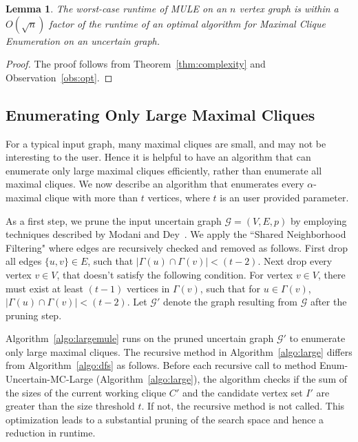 \documentclass[11pt,letterpaper]{article}
\newtheorem{lemma}{Lemma}
\newcommand{\ugraph}{\mathcal{G}}
\begin{document}
\begin{lemma}
\label{obs:timefactor}
The worst-case runtime of MULE on an $n$ vertex graph is within a $O(\sqrt{n})$ factor of the runtime of an optimal algorithm for Maximal Clique Enumeration on an uncertain graph.
\end{lemma}

\begin{proof}
The proof follows from Theorem~\ref{thm:complexity} and Observation~\ref{obs:opt}. 
\end{proof}

\subsection{Enumerating Only Large Maximal Cliques}
For a typical input graph, many maximal cliques are small, and may not be interesting to the user. Hence it is helpful to have an algorithm that can enumerate only large maximal cliques efficiently, rather than enumerate all maximal cliques. We now describe an algorithm that enumerates every $\alpha$-maximal clique with more than $t$ vertices, where $t$ is an user provided parameter.

As a first step, we prune the input uncertain graph $\ugraph = (V,E,p)$ by employing techniques described by Modani and Dey~\cite{Modani08}. We apply the ``Shared Neighborhood Filtering" where edges are recursively checked and removed as follows. First drop all edges $\{u,v\} \in E$, such that $\left | \Gamma(u) \cap \Gamma(v) \right | < (t-2)$. Next drop every vertex $v \in V$, that doesn't satisfy the following condition. For vertex $v \in V$, there must exist at least $(t-1)$ vertices in $\Gamma(v)$, such that for $u \in \Gamma(v)$, $\left | \Gamma(u) \cap \Gamma(v) \right | < (t-2)$. 
Let $\ugraph'$ denote the graph resulting from $\ugraph$ after the pruning step.

Algorithm~\ref{algo:largemule} runs on the pruned uncertain graph $\ugraph'$ to enumerate only large maximal cliques. The recursive method in Algorithm~\ref{algo:large} differs from Algorithm~\ref{algo:dfs} as follows. Before each recursive call to method Enum-Uncertain-MC-Large (Algorithm~\ref{algo:large}), the algorithm checks if the sum of the sizes of the current working clique $C'$ and the candidate vertex set $I'$ are greater than the size threshold $t$. If not, the recursive method is not called. This optimization leads to a substantial pruning of the search space and hence a reduction in runtime.
\end{document}
